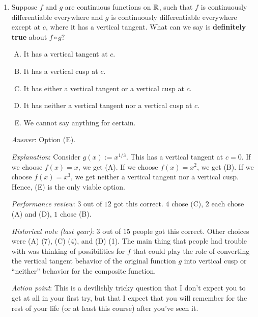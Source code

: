 \documentclass[10pt]{amsart}
\begin{document}
\begin{enumerate}
  {\em Performance review}: $6$ out of $12$ got this correct. $5$
  chose (E), $1$ chose (B).

  {\em Historical note (last year)}: $5$ out of $15$ people got this
  correct. Other choices were (E) (5), (C) (3), (B) (1), (D) (1).  The
  main source of confusion here seems to have been that people did not
  realize if $f$ has a vertical tangent at $c$, so does $-f$, because
  the whole picture flips over.
\item Suppose $f$ and $g$ are continuous functions on $\mathbb{R}$, such that
  $f$ is continuously differentiable everywhere and $g$ is
  continuously differentiable everywhere except at $c$, where it has a
  vertical tangent. What can we say is {\bf definitely true} about $f
  \circ g$?

  \begin{enumerate}[(A)]
  \item It has a vertical tangent at $c$.
  \item It has a vertical cusp at $c$.
  \item It has either a vertical tangent or a vertical cusp at $c$.
  \item It has neither a vertical tangent nor a vertical cusp at $c$.
  \item We cannot say anything for certain.
  \end{enumerate}

  {\em Answer}: Option (E).

  {\em Explanation}: Consider $g(x) := x^{1/3}$. This has a vertical
  tangent at $c = 0$. If we choose $f(x) = x$, we get (A). If we
  choose $f(x) = x^2$, we get (B). If we choose $f(x) = x^3$, we get
  neither a vertical tangent nor a vertical cusp. Hence, (E) is the
  only viable option.

  {\em Performance review}: $3$ out of $12$ got this correct. $4$
  chose (C), $2$ each chose (A) and (D), $1$ chose (B).

  {\em Historical note (last year)}: $3$ out of $15$ people got this
  correct. Other choices were (A) (7), (C) (4), and (D) (1). The main
  thing that people had trouble with was thinking of possibilities for
  $f$ that could play the role of converting the vertical tangent
  behavior of the original function $g$ into vertical cusp or
  ``neither'' behavior for the composite function.

  {\em Action point}: This is a devilishly tricky question that I
  don't expect you to get at all in your first try, but that I expect
  that you will remember for the rest of your life (or at least this
  course) after you've seen it.
\end{enumerate}
\end{document}
